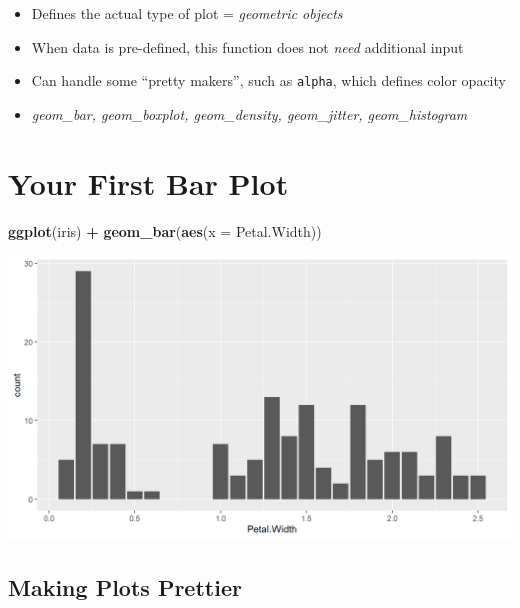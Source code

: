 \documentclass[
]{book}
\newenvironment{Shaded}{\begin{snugshade}}{\end{snugshade}}
\newcommand{\AttributeTok}[1]{\textcolor[rgb]{0.13,0.29,0.53}{#1}}
\newcommand{\FunctionTok}[1]{\textcolor[rgb]{0.13,0.29,0.53}{\textbf{#1}}}
\newcommand{\NormalTok}[1]{#1}
\newcommand{\SpecialCharTok}[1]{\textcolor[rgb]{0.81,0.36,0.00}{\textbf{#1}}}
\providecommand{\tightlist}{%
  \setlength{\itemsep}{0pt}\setlength{\parskip}{0pt}}
\begin{document}
\begin{itemize}
\tightlist
\item
  Defines the actual type of plot = \emph{geometric objects}
\item
  When data is pre-defined, this function does not \emph{need} additional input
\item
  Can handle some ``pretty makers'', such as \texttt{alpha}, which defines color opacity
\item
  \emph{geom\_bar, geom\_boxplot, geom\_density, geom\_jitter, geom\_histogram}
\end{itemize}

\section{Your First Bar Plot}\label{your-first-bar-plot}

\begin{Shaded}
\begin{Highlighting}[]
\FunctionTok{ggplot}\NormalTok{(iris) }\SpecialCharTok{+} 
  \FunctionTok{geom\_bar}\NormalTok{(}\FunctionTok{aes}\NormalTok{(}\AttributeTok{x =}\NormalTok{ Petal.Width)) }
\end{Highlighting}
\end{Shaded}

\begin{flushleft}\includegraphics{_main_files/figure-html/fbarplot-1} \end{flushleft}

\subsection{Making Plots Prettier}\label{making-plots-prettier}
\end{document}
